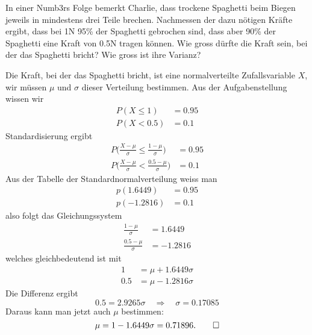 In einer Numb3rs Folge bemerkt Charlie, dass trockene Spaghetti beim
Biegen jeweils
in mindestens drei Teile brechen. Nachmessen der dazu nötigen Kräfte
ergibt, dass bei 1N 95\% der Spaghetti gebrochen sind, dass aber 90\%
der Spaghetti eine Kraft von 0.5N tragen können. Wie gross dürfte
die Kraft sein, bei der das Spaghetti bricht? Wie gross ist ihre Varianz?

\begin{loesung}
Die Kraft, bei der das Spaghetti bricht, ist eine normalverteilte
Zufallsvariable $X$, wir müssen $\mu$ und $\sigma$ dieser Verteilung
bestimmen. Aus der Aufgabenstellung wissen wir
\begin{align*}
P(X \le 1)&=0.95\\
P(X < 0.5)&=0.1
\end{align*}
Standardisierung ergibt
\begin{align*}
P\biggl(\frac{X-\mu}{\sigma} \le \frac{1-\mu}{\sigma}\biggr)&=0.95\\
P\biggl(\frac{X-\mu}{\sigma} < \frac{0.5-\mu}{\sigma}\biggr)&=0.1
\end{align*}
Aus der Tabelle der Standardnormalverteilung weiss man
\begin{align*}
p(1.6449)&=0.95\\
p(-1.2816)&=0.1
\end{align*}
also folgt das Gleichungssystem
\begin{align*}
\frac{1-\mu}{\sigma}&=1.6449\\
\frac{0.5-\mu}{\sigma}&=-1.2816
\end{align*}
welches gleichbedeutend ist mit
\begin{align*}
1&=\mu+1.6449\sigma\\
0.5&=\mu-1.2816\sigma
\end{align*}
Die Differenz ergibt
\[
0.5 = 2.9265\sigma\quad\Rightarrow\quad \sigma = 0.17085
\]
Daraus kann man jetzt auch $\mu$ bestimmen:
\[
\mu = 1-1.6449\sigma =  0.71896.
\qedhere
\]
\end{loesung}

